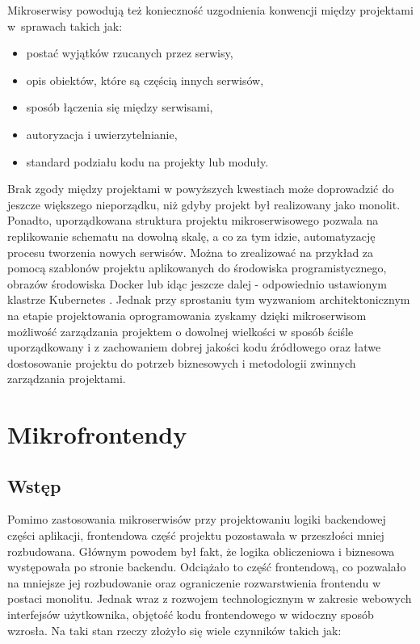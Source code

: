 \documentclass{SGGW-thesis}
\begin{document}
Mikroserwisy powodują też konieczność uzgodnienia konwencji między projektami w~sprawach takich jak:

\begin{itemize}
	\item postać wyjątków rzucanych przez serwisy,
	\item opis obiektów, które są częścią innych serwisów,
	\item sposób łączenia się między serwisami,
	\item autoryzacja i uwierzytelnianie,
	\item standard podziału kodu na projekty lub moduły.
\end{itemize}
Brak zgody między projektami w powyższych kwestiach może doprowadzić do jeszcze większego nieporządku, niż gdyby projekt był realizowany jako monolit. Ponadto, uporządkowana struktura projektu mikroserwisowego pozwala na replikowanie schematu na dowolną skalę, a co za tym idzie, automatyzację procesu tworzenia nowych serwisów. Można to zrealizować na przykład za pomocą szablonów projektu aplikowanych do środowiska programistycznego, obrazów środowiska Docker \cite{docker} lub idąc jeszcze dalej - odpowiednio ustawionym klastrze Kubernetes \cite{kubernetes}. Jednak przy sprostaniu tym wyzwaniom architektonicznym na etapie projektowania oprogramowania zyskamy dzięki mikroserwisom możliwość zarządzania projektem o dowolnej wielkości w sposób ściśle uporządkowany i z zachowaniem dobrej jakości kodu źródłowego oraz łatwe dostosowanie projektu do potrzeb biznesowych i metodologii zwinnych zarządzania projektami.

\chapter{Mikrofrontendy}
\section{Wstęp}
Pomimo zastosowania mikroserwisów przy projektowaniu logiki backendowej części aplikacji, frontendowa część projektu pozostawała w przeszłości mniej rozbudowana. Głównym powodem był fakt, że logika obliczeniowa i biznesowa występowała po stronie backendu. Odciążało to część frontendową, co pozwalało na mniejsze jej rozbudowanie oraz ograniczenie rozwarstwienia frontendu w postaci monolitu. Jednak wraz z rozwojem technologicznym w zakresie webowych interfejsów użytkownika, objętość kodu frontendowego w widoczny sposób wzrosła. Na taki stan rzeczy złożyło się wiele czynników takich jak:
\end{document}
